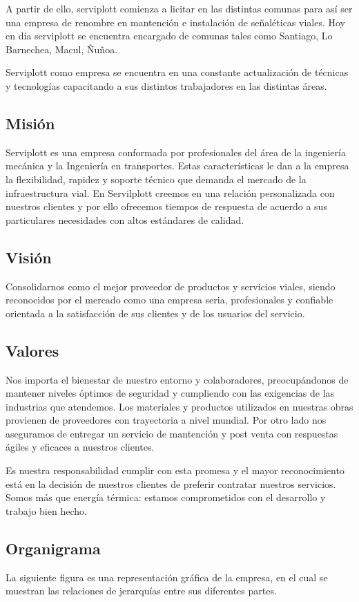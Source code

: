 A partir de ello, serviplott comienza a licitar en las distintas comunas para así ser una empresa de renombre en mantención e instalación de señaléticas viales. Hoy en día serviplott se encuentra encargado de comunas tales como Santiago, Lo Barnechea, Macul, Ñuñoa.\vspace{5mm}

Serviplott como empresa se encuentra en una constante actualización de técnicas y tecnologías capacitando a sus distintos trabajadores  en las distintas áreas. 


	\subsection{Misión}
	Serviplott es una empresa conformada por profesionales del área de la ingeniería mecánica y la Ingeniería en transportes. Estas características le dan a la empresa la flexibilidad, rapidez y soporte técnico que demanda el mercado de la infraestructura vial. En Servilplott creemos en una relación personalizada con nuestros clientes y por ello ofrecemos tiempos de respuesta de acuerdo a sus particulares necesidades con altos estándares de calidad.
	\subsection{Visión}
Consolidarnos como el mejor proveedor de productos y servicios viales, siendo reconocidos por el mercado como una empresa seria, profesionales y confiable orientada a la satisfacción de sus clientes y de los usuarios del servicio.

	\subsection{Valores}
	Nos importa el bienestar de nuestro entorno y colaboradores, preocupándonos de mantener niveles óptimos de seguridad y cumpliendo con las exigencias de las industrias que atendemos. Los materiales y productos utilizados en nuestras obras provienen de proveedores con trayectoria a nivel mundial. Por otro lado nos aseguramos de entregar un servicio de mantención y post venta con respuestas ágiles y eficaces a nuestros clientes.


Es nuestra responsabilidad cumplir con esta promesa y el mayor reconocimiento está en la decisión de nuestros clientes de preferir contratar nuestros servicios. Somos más que energía térmica: estamos comprometidos con el desarrollo y
trabajo bien hecho.
	\subsection{Organigrama}
	La siguiente figura es una representación gráfica de la empresa, en el cual se muestran las relaciones de jerarquías entre sus diferentes partes. 
	
